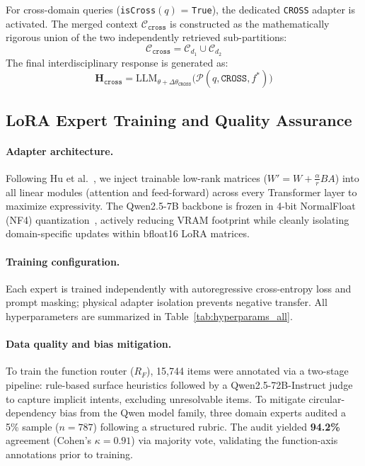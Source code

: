 \documentclass[a4paper,fleql]{cas-sc}
\begin{document}
For cross-domain queries (\texttt{isCross}$(q)$ = \texttt{True}), the
dedicated \texttt{CROSS} adapter is activated. The merged context
$\mathcal{C}_{\texttt{cross}}$ is constructed as the mathematically rigorous
union of the two independently retrieved sub-partitions:
\begin{equation}
    \mathcal{C}_{\texttt{cross}} = \mathcal{C}_{d_1} \cup \mathcal{C}_{d_2}
    \label{eq:cross_ctx}
\end{equation}
The final interdisciplinary response is generated as:
\begin{equation}
    \mathbf{H}_{\texttt{cross}} = \text{LLM}_{\theta +
    \Delta\theta_{\texttt{CROSS}}}
    \big( \mathcal{P}(q, \texttt{CROSS}, f^*) \big)
    \label{eq:cross_gen}
\end{equation}

\subsection{LoRA Expert Training and Quality Assurance}
\label{ssec:loratrain}
\paragraph{Adapter architecture.}
Following Hu et al.~\citep{hu2022lora}, we inject trainable low-rank matrices ($W' = W + \frac{\alpha}{r} BA$) into all linear modules (attention and feed-forward) across every Transformer layer to maximize expressivity. The Qwen2.5-7B backbone is frozen in 4-bit NormalFloat (NF4) quantization~\citep{dettmers2023qlora}, actively reducing VRAM footprint while cleanly isolating domain-specific updates within bfloat16 LoRA matrices.
\paragraph{Training configuration.}
Each expert is trained independently with autoregressive cross-entropy loss
and prompt masking; physical adapter isolation prevents negative transfer.
All hyperparameters are summarized in Table~\ref{tab:hyperparams_all}.
\paragraph{Data quality and bias mitigation.}
To train the function router ($R_F$), 15,744 items were annotated via a
two-stage pipeline: rule-based surface heuristics followed by a
Qwen2.5-72B-Instruct judge to capture implicit intents, excluding
unresolvable items. To mitigate circular-dependency bias from the Qwen
model family, three domain experts audited a 5\% sample ($n = 787$)
following a structured rubric. The audit yielded \textbf{94.2\%} agreement
(Cohen's $\kappa = 0.91$) via majority vote, validating the function-axis
annotations prior to training.
\end{document}
